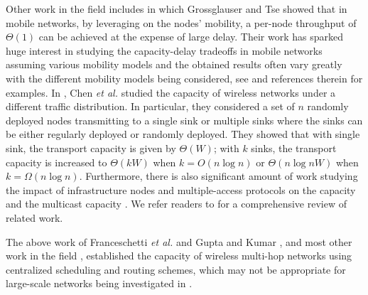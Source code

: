 \documentclass[english]{IEEEtran}
\theoremstyle{plain}
\theoremstyle{plain}
\theoremstyle{plain}
\theoremstyle{remark}
\begin{document}
Other work in the field includes \cite{Grossglauser02Mobility} in
which Grossglauser and Tse showed that in mobile networks, by leveraging
on the nodes' mobility, a per-node throughput of $\Theta\left(1\right)$
can be achieved at the expense of large delay. Their work \cite{Grossglauser02Mobility}
has sparked huge interest in studying the capacity-delay tradeoffs
in mobile networks assuming various mobility models and the obtained
results often vary greatly with the different mobility models being
considered, see \cite{Jacquet12On,Kong08Connectivity,Li09Capacity,Neely05Capacity,EI06Optimal,EI06OptimalThroughput}
and references therein for examples. In \cite{Chen09Order}, Chen
\emph{et al.} studied the capacity of wireless networks under a different
traffic distribution. In particular, they considered a set of $n$
randomly deployed nodes transmitting to a single sink or multiple
sinks where the sinks can be either regularly deployed or randomly
deployed. They showed that with single sink, the transport capacity
is given by $\Theta\left(W\right)$; with $k$ sinks, the transport
capacity is increased to $\Theta\left(kW\right)$ when $k=O(n\log n)$
or $\Theta\left(n\log nW\right)$ when $k=\Omega\left(n\log n\right)$.
Furthermore, there is also significant amount of work studying the
impact of infrastructure nodes \cite{Zemlianov05Capacity} and multiple-access
protocols \cite{Durvy09On,Alfano11New} on the capacity and the multicast
capacity \cite{Li09Multicast}. We refer readers to \cite{Haenggi09Stochastic}
for a comprehensive review of related work.

The above work of Franceschetti \emph{et al.} \cite{Franceschetti07Closing}
and Gupta and Kumar \cite{Gupta00Capacity,Xie04A}, and most other
work in the field \cite{Alfano09Capacity,Cho06Capacity,Dousse06On,Hu10A,Kulkarni04A,Li09Impacts,Li11The},
established the capacity of wireless multi-hop networks using centralized
scheduling and routing schemes, which may not be appropriate for large-scale
networks being investigated in \cite{Franceschetti07Closing,Gupta00Capacity,Xie04A}. 
\end{document}
